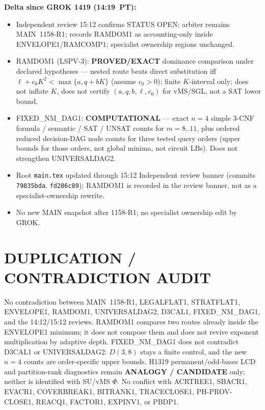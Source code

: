 \documentclass[11pt]{article}
\begin{document}
\textbf{Delta since GROK 1419 (14:19~PT):}
\begin{itemize}
\item Independent review 15:12 confirms STATUS OPEN; arbiter remains MAIN~1158-R1;
records RAMDOM1 as accounting-only inside ENVELOPE1/RAMCOMP1; specialist ownership
regions unchanged.
\item RAMDOM1 (LSPV-3): \textbf{PROVED/EXACT} dominance comparison under declared
hypotheses --- nested route beats direct substitution iff
$\ell+c_0K^2<\max\{a,q+bK\}$ (assume $c_0>0$); finite $K$-interval only; does not
inflate $K$, does not certify $(a,q,b,\ell,c_0)$ for vMS/SGL, not a SAT lower bound.
\item FIXED\_NM\_DAG1: \textbf{COMPUTATIONAL} --- exact $n{=}4$ simple 3-CNF formula /
semantic / SAT / UNSAT counts for $m=8..11$, plus ordered reduced decision-DAG node
counts for three tested query orders (upper bounds for those orders, not global minima,
not circuit LBs). Does not strengthen UNIVERSALDAG2.
\item Root \texttt{main.tex} updated through 15:12 Independent review banner (commits
\texttt{79835bda}, \texttt{fd286c89}); RAMDOM1 is recorded in the review banner, not as
a specialist-ownership rewrite.
\item No new MAIN snapshot after 1158-R1; no specialist ownership edit by GROK.
\end{itemize}

\section*{DUPLICATION / CONTRADICTION AUDIT}
No contradiction between MAIN~1158-R1, LEGALFLAT1, STRATFLAT1, ENVELOPE1, RAMDOM1,
UNIVERSALDAG2, D3CAL1, FIXED\_NM\_DAG1, and the 14:12/15:12 reviews. RAMDOM1 compares
two routes already inside the ENVELOPE1 minimum; it does not compose them and does not
revive exponent multiplication by adaptive depth. FIXED\_NM\_DAG1 does not contradict
D3CAL1 or UNIVERSALDAG2: $D(3,8)$ stays a finite control, and the new $n{=}4$ counts are
order-specific upper bounds. H1319 permanent/odd-bases LCD and partition-rank diagnostics
remain \textbf{ANALOGY / CANDIDATE} only; neither is identified with SU/vMS $\Phi$.
No conflict with ACRTREE1, SBACR1, EVACR1, COVERBREAK1, BITRANK1, TRACECLOSE1,
PH-PROV-CLOSE1, REACQ1, FACTOR1, EXPINV1, or PBDP1.
\end{document}
